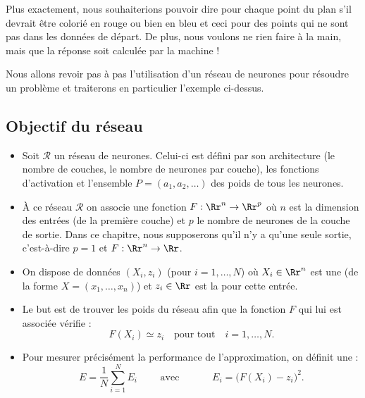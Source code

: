 \documentclass[11pt,class=report,crop=false]{standalone}
\begin{document}
Plus exactement, nous souhaiterions pouvoir dire pour chaque point du plan s'il devrait être colorié en rouge ou bien en bleu et ceci pour des points qui ne sont pas dans les données de départ. De plus, nous voulons ne rien faire à la main, mais que la réponse soit calculée par la machine !

Nous allons revoir pas à pas l'utilisation d'un réseau de neurones pour résoudre un problème et traiterons en particulier l'exemple ci-dessus.

\subsection{Objectif du réseau}

\begin{itemize}
  \item Soit $\mathcal{R}$ un réseau de neurones. Celui-ci est défini par son architecture (le nombre de couches, le nombre de neurones par couche), les fonctions d'activation et l'ensemble $P = (a_1,a_2,\ldots)$ des poids de tous les neurones.
  
  \item \`A ce réseau $\mathcal{R}$ on associe une fonction $F : \Rr^n \to \Rr^p$ où $n$ est la dimension des entrées (de la première couche) et $p$ le nombre de neurones de la couche de sortie.
  Dans ce chapitre, nous supposerons qu'il n'y a qu'une seule sortie, c'est-à-dire $p=1$ et $F : \Rr^n \to \Rr$.
  
 
    
  \item On dispose de données $(X_i,z_i)$ (pour $i=1,\ldots,N$) où $X_i \in \Rr^n$ est une  (de la forme $X=(x_1,\ldots,x_n)$) et $z_i \in \Rr$ est la  pour cette entrée.
  
  \item Le but est de trouver les poids du réseau afin que la fonction $F$ qui lui est associée vérifie :
  $$F(X_i) \simeq z_i \quad \text{pour tout} \quad i=1,\ldots,N.$$ 
  
  \item Pour mesurer précisément la performance de l'approximation, on définit une  :
  $$E = \frac{1}N \sum_{i=1}^N E_i \qquad \text{ avec } \qquad \quad E_i = \big( F(X_i) - z_i \big)^2.$$
\end{itemize}
\end{document}
